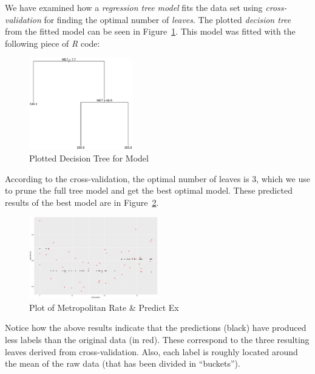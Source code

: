\documentclass[a4paper, twocolumn]{article}
\begin{document}
        We have examined how a \emph{regression tree model} fits the data set using \emph{cross-validation} for finding the optimal number of \emph{leaves}. The plotted \emph{decision tree} from the fitted model can be seen in Figure~\ref{fig:tree}. This model was fitted with the following piece of \emph{R} code:

        

        \begin{figure}[h!]
            \centering
            \caption{Plotted Decision Tree for Model}
            \label{fig:tree}
            \includegraphics[width=0.4\textwidth]{share/A1_tree.eps}
        \end{figure}

        According to the cross-validation, the optimal number of leaves is 3, which we use to prune the full tree model and get the best optimal model. These predicted results of the best model are in Figure~\ref{fig:predicted}.

        \begin{figure}[h!]
            \centering
            \caption{Plot of Metropolitan Rate \& Predict Ex}
            \label{fig:predicted}
            \includegraphics[width=0.5\textwidth]{share/A1_fit.eps}
        \end{figure}

        Notice how the above results indicate that the predictions (black) have produced less labels than the original data (in red). These correspond to the three resulting leaves derived from cross-validation. Also, each label is roughly located around the mean of the raw data (that has been divided in ``buckets'').
\end{document}
